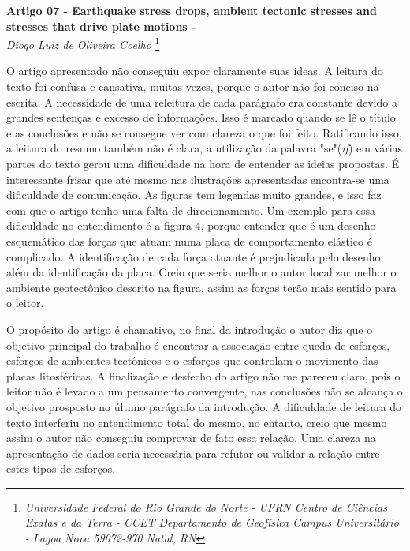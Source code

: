 \documentclass[manuscript]{geophysics}[10pt]
\begin{document}
\begin{center}
\textbf{\LARGE
 Artigo 07 - Earthquake stress drops, ambient tectonic stresses and stresses that drive plate motions - \cite{hanks_earthquake_1977}} \\
\textit{Diogo Luiz de Oliveira Coelho}
\footnote{\textit{Universidade Federal do Rio Grande do Norte - UFRN
Centro de Ciências Exatas e da Terra - CCET
Departamento de Geofísica
Campus Universitário - Lagoa Nova
59072-970 Natal, RN}}
\end{center} 



O artigo apresentado não conseguiu expor claramente suas ideas. A leitura do texto foi confusa e cansativa, muitas vezes, porque o autor não foi conciso na escrita. A necessidade de uma releitura de cada parágrafo era constante devido a grandes sentenças e excesso de informações. Isso é marcado quando se lê o título e as conclusões e não se consegue ver com clareza o que foi feito. Ratificando isso, a leitura do resumo também não é clara, a utilização da palavra "se"(\textit{if}) em várias partes do texto gerou uma dificuldade na hora de entender as ideias propostas. É interessante frisar que até mesmo nas ilustrações apresentadas encontra-se uma dificuldade de comunicação. As figuras tem legendas muito grandes, e isso faz com que o artigo tenho uma falta de direcionamento. Um exemplo para essa dificuldade no entendimento é a figura 4, porque entender que é um desenho esquemático das forças que atuam numa placa de comportamento elástico é complicado. A identificação de cada força atuante é prejudicada pelo desenho, além da identificação da placa. Creio que seria melhor o autor localizar melhor o ambiente geotectônico descrito na figura, assim as forças terão mais sentido para o leitor.

O propósito do artigo é chamativo, no final da introdução o autor diz que o objetivo principal do trabalho é encontrar a associação entre queda de esforços, esforços de ambientes tectônicos e o esforços que controlam o movimento das placas litosféricas. A finalização e desfecho do artigo não me pareceu claro, pois o leitor não é levado a um pensamento convergente, nas conclusões não se alcança o objetivo prosposto no último parágrafo da introdução. A dificuldade de leitura do texto interferiu no entendimento total do mesmo, no entanto, creio que mesmo assim o autor não conseguiu comprovar de fato essa relação. Uma clareza na apresentação de dados seria necessária para refutar ou validar a relação entre estes tipos de esforços.



    
\end{document}
